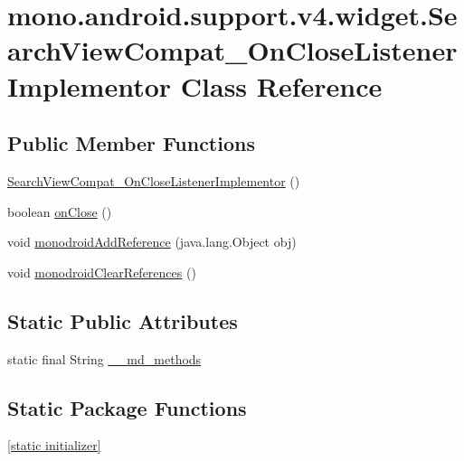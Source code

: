 \hypertarget{classmono_1_1android_1_1support_1_1v4_1_1widget_1_1_search_view_compat___on_close_listener_implementor}{
\section{mono.android.support.v4.widget.SearchViewCompat\_\-OnCloseListenerImplementor Class Reference}
\label{classmono_1_1android_1_1support_1_1v4_1_1widget_1_1_search_view_compat___on_close_listener_implementor}
}
\subsection*{Public Member Functions}
\begin{CompactItemize}
\item 
\hyperlink{classmono_1_1android_1_1support_1_1v4_1_1widget_1_1_search_view_compat___on_close_listener_implementor_06ae1e4594a8753a73417782696ce42f}{SearchViewCompat\_\-OnCloseListenerImplementor} ()
\item 
boolean \hyperlink{classmono_1_1android_1_1support_1_1v4_1_1widget_1_1_search_view_compat___on_close_listener_implementor_f382d1e5ba1dd24c3e6ff0e4e678c4d5}{onClose} ()
\item 
void \hyperlink{classmono_1_1android_1_1support_1_1v4_1_1widget_1_1_search_view_compat___on_close_listener_implementor_a57445a3eabf952599982d658b45f796}{monodroidAddReference} (java.lang.Object obj)
\item 
void \hyperlink{classmono_1_1android_1_1support_1_1v4_1_1widget_1_1_search_view_compat___on_close_listener_implementor_6d5cfc110dcde508f6d83f879700616e}{monodroidClearReferences} ()
\end{CompactItemize}
\subsection*{Static Public Attributes}
\begin{CompactItemize}
\item 
static final String \hyperlink{classmono_1_1android_1_1support_1_1v4_1_1widget_1_1_search_view_compat___on_close_listener_implementor_89aae80e52a06e276333257f14abb6c3}{\_\-\_\-md\_\-methods}
\end{CompactItemize}
\subsection*{Static Package Functions}
\begin{CompactItemize}
\item 
\hyperlink{classmono_1_1android_1_1support_1_1v4_1_1widget_1_1_search_view_compat___on_close_listener_implementor_42c1219916c149393d30d8504e4b371a}{\mbox{[}static initializer\mbox{]}}
\end{CompactItemize}
